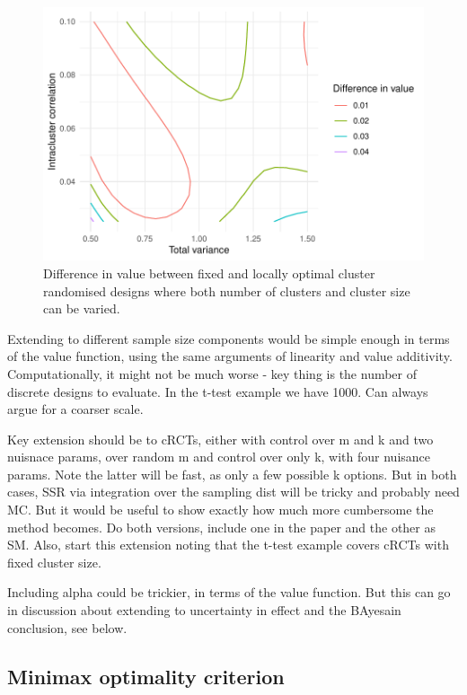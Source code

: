 \documentclass[sagev, Crown]{sagej}
\begin{document}
\begin{figure}
\centering
\includegraphics[scale=0.8]{./figures/mult_design}
\caption{Difference in value between fixed and locally optimal cluster randomised designs where both number of clusters and cluster size can be varied.}
\label{fig:mult_design}
\end{figure}

Extending to different sample size components would be simple enough in terms of the value function, using the same arguments of linearity and value additivity. Computationally, it might not be much worse - key thing is the number of discrete designs to evaluate. In the t-test example we have 1000. Can always argue for a coarser scale.

Key extension should be to cRCTs, either with control over m and k and two nuisnace params, over random m and control over only k, with four nuisance params. Note the latter will be fast, as only a few possible k options. But in both cases, SSR via integration over the sampling dist will be tricky and probably need MC. But it would be useful to show exactly how much more cumbersome the method becomes. Do both versions, include one in the paper and the other as SM. Also, start this extension noting that the t-test example covers cRCTs with fixed cluster size. 

Including alpha could be trickier, in terms of the value function. But this can go in discussion about extending to uncertainty in effect and the BAyesain conclusion, see below.

\subsection{Minimax optimality criterion}
\end{document}
